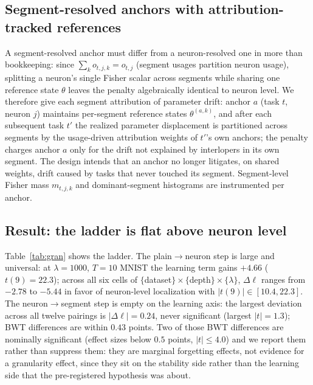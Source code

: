 \documentclass[review,12pt,number]{elsarticle}
\begin{document}
\subsection{Segment-resolved anchors with attribution-tracked references}
\label{sec:branchdesign}

A segment-resolved anchor must differ from a neuron-resolved one in more
than bookkeeping: since $\sum_k o_{t,j,k} = o_{t,j}$ (segment usages
partition neuron usage), splitting a neuron's single Fisher scalar across
segments while sharing one reference state $\theta$ leaves the penalty
algebraically identical to neuron level. We therefore give each segment
attribution of parameter drift: anchor $a$ (task $t$, neuron $j$) maintains
per-segment reference states $\theta^{(a,k)}$, and after each subsequent
task $t'$ the realized parameter displacement is partitioned across segments
by the usage-driven attribution weights of $t'$'s own anchors; the penalty
charges anchor $a$ only for the drift not explained by interlopers in its
own segment. The design intends that an anchor no longer litigates, on
shared weights, drift caused by tasks that never touched its segment.
Segment-level Fisher mass $m_{t,j,k}$ and dominant-segment histograms are
instrumented per anchor.

\subsection{Result: the ladder is flat above neuron level}

Table~\ref{tab:gran} shows the ladder. The plain$\to$neuron step is large
and universal: at $\lambda{=}1000$, $T{=}10$ MNIST the learning term gains
$+4.66$ ($t(9){=}22.3$); across all six cells of
$\{$dataset$\}\times\{$depth$\}\times\{\lambda\}$, $\Delta\ell$ ranges from
$-2.78$ to $-5.44$ in favor of neuron-level localization with
$|t(9)| \in [10.4, 22.3]$. The neuron$\to$segment step is empty on the learning axis: the
largest deviation across all twelve pairings is $|\Delta\ell| = 0.24$,
never significant (largest $|t| = 1.3$); BWT differences are within
$0.43$ points. Two of those BWT differences are nominally significant
(effect sizes below $0.5$ points, $|t| \le 4.0$) and we report them rather
than suppress them: they are marginal forgetting effects, not evidence for
a granularity effect, since they sit on the stability side rather than the
learning side that the pre-registered hypothesis was about.
\end{document}
